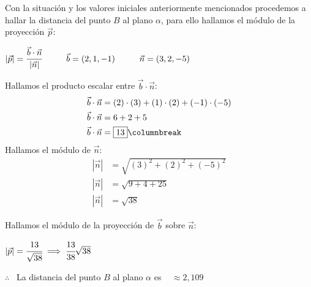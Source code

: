 \noindent Con la situación y los valores iniciales anteriormente mencionados procedemos a hallar la distancia del punto $B$ al plano $\alpha$, para ello hallamos el módulo de la proyección $\vec{p}$:
\begin{center}
	$|\vec{p}|  =\cfrac{\vec{b} \cdot \vec{n}}{|\vec{n}|} \hspace*{1cm} \vec{b}=(2, 1, -1) \hspace*{1cm} \vec{n}=(3, 2, -5)$
\end{center}
\begin{multicols}{2}
	\noindent Hallamos el producto escalar entre $\vec{b} \cdot \vec{n}$:
	\begin{align*}
		\vec{b} \cdot \vec{n} & = (2) \cdot (3) + (1) \cdot (2) + (-1) \cdot (-5) \\
		\vec{b} \cdot \vec{n} & = 6 + 2 + 5                                       \\
		\vec{b} \cdot \vec{n} & = \boxed{13}
		\columnbreak
	\end{align*}
	\noindent Hallamos el módulo de $\vec{n}$:
	\begin{align*}
		|\vec{n}| & = \sqrt{(3)^2 + (2)^2 + (-5)^2} \\
		|\vec{n}| & = \sqrt{9 + 4 + 25}             \\
		|\vec{n}| & = \boxed{\sqrt{38}}
	\end{align*}
\end{multicols}
\noindent Hallamos el módulo de la proyección de $\vec{b}$ sobre $\vec{n}$:

$|\vec{p}| =\cfrac{13}{\sqrt{38}} \implies \cfrac{13}{38}\sqrt{38}$

\noindent $\therefore$ \ La distancia del punto $B$ al plano $\alpha$ es \   $\approx 2,109$